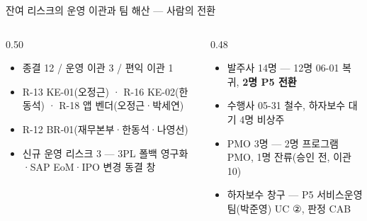 \begin{frame}{잔여 리스크의 운영 이관과 팀 해산 — 사람의 전환}
\begin{columns}[T]
\begin{column}{0.50\textwidth}
\begin{itemize}
\item 종결 12 / 운영 이관 3 / 편익 이관 1
\item R-13 \ra{} KE-01(오정근) · R-16 \ra{} KE-02(한동석) · R-18 \ra{} 앱 벤더(오정근·박세연)
\item R-12 \ra{} BR-01(재무본부·한동석·나영선)
\item 신규 운영 리스크 3 — 3PL 폴백 영구화·SAP EoM·IPO 변경 동결 창
\end{itemize}
\end{column}
\begin{column}{0.48\textwidth}
\begin{itemize}
\item 발주사 14명 — 12명 06-01 복귀, \textbf{2명 P5 전환}
\item 수행사 05-31 철수, 하자보수 대기 4명 비상주
\item PMO 3명 — 2명 프로그램 PMO, 1명 잔류(승인 전, 이관 10)
\item 하자보수 창구 — P5 서비스운영팀(박준영) \ra{} UC ②, 판정 CAB
\end{itemize}
\end{column}
\end{columns}
\end{frame}

